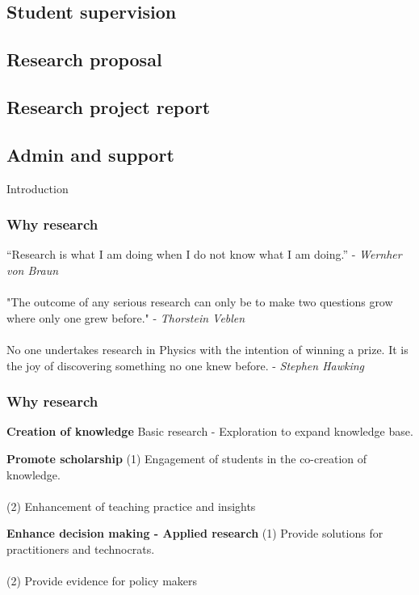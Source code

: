 \documentclass{beamer}
\begin{document}
\subsection{Student supervision}
\subsection{Research proposal}
\subsection{Research project report}
\subsection{Admin and support}
\begin{frame}
\begin{center}
\Huge Introduction
\end{center}
\end{frame}

\begin{frame}
\frametitle{\textbf{Why research}}
“Research is what I am doing when I do not know what I am doing.” - \textit{Wernher von Braun}\\~\\

"The outcome of any serious research can only be to make two questions grow where only one grew before." - \textit{Thorstein Veblen}\\~\\

No one undertakes research in Physics with the intention of winning a prize. It is the joy of discovering something no one knew before. - \textit{Stephen Hawking} 

\end{frame}


\begin{frame}
\frametitle{\textbf{Why research}}
\begin{block}{\textbf{Creation of knowledge}}
Basic research - Exploration to expand knowledge base.
\end{block}

\begin{block}{\textbf{Promote scholarship}}
(1) Engagement of students in the co-creation of knowledge.\\~\\
(2) Enhancement of teaching practice and insights 
\end{block}

\begin{block}{\textbf{Enhance decision making - Applied research}}
(1) Provide solutions for practitioners and technocrats.\\~\\
(2) Provide evidence for policy makers

\end{block}
\end{frame}
\end{document}
